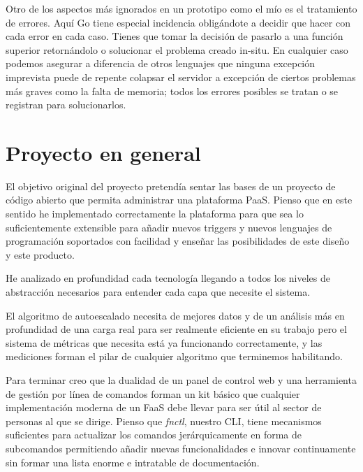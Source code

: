 Otro de los aspectos más ignorados en un prototipo como el mío es el tratamiento de errores. Aquí Go tiene especial incidencia obligándote a decidir que hacer con cada error en cada caso. Tienes que tomar la decisión de pasarlo a una función superior retornándolo o solucionar el problema creado in-situ. En cualquier caso podemos asegurar a diferencia de otros lenguajes que ninguna excepción imprevista puede de repente colapsar el servidor a excepción de ciertos problemas más graves como la falta de memoria; todos los errores posibles se tratan o se registran para solucionarlos.

\section{Proyecto en general}

El objetivo original del proyecto pretendía sentar las bases de un proyecto de código abierto que permita administrar una plataforma PaaS. Pienso que en este sentido he implementado correctamente la plataforma para que sea lo suficientemente extensible para añadir nuevos triggers y nuevos lenguajes de programación soportados con facilidad y enseñar las posibilidades de este diseño y este producto.

He analizado en profundidad cada tecnología llegando a todos los niveles de abstracción necesarios para entender cada capa que necesite el sistema.

El algoritmo de autoescalado necesita de mejores datos y de un análisis más en profundidad de una carga real para ser realmente eficiente en su trabajo pero el sistema de métricas que necesita está ya funcionando correctamente, y las mediciones forman el pilar de cualquier algoritmo que terminemos habilitando.

Para terminar creo que la dualidad de un panel de control web y una herramienta de gestión por línea de comandos forman un kit básico que cualquier implementación moderna de un FaaS debe llevar para ser útil al sector de personas al que se dirige. Pienso que \emph{fnctl}, nuestro CLI, tiene mecanismos suficientes para actualizar los comandos jerárquicamente en forma de subcomandos permitiendo añadir nuevas funcionalidades e innovar continuamente sin formar una lista enorme e intratable de documentación.
